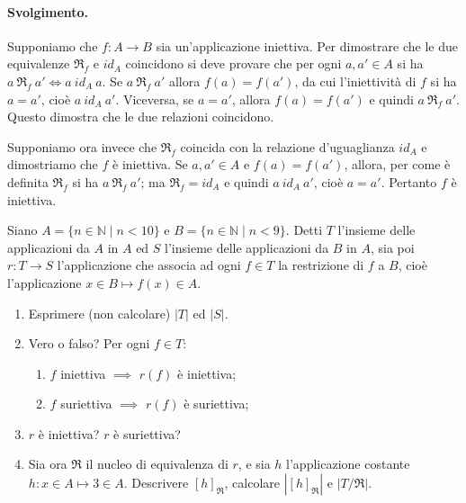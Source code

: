 \paragraph{Svolgimento.} Supponiamo che $f:A \rightarrow B$ sia un'applicazione iniettiva. Per dimostrare che le due equivalenze $\mathfrak{R}_{f}$ e $id_{A}$ coincidono si deve provare che per ogni $a,a' \in A$ si ha $a \ \mathfrak{R}_{f} \ a' \iff a \ id_{A} \ a$. Se $a \ \mathfrak{R}_{f} \ a'$ allora $f(a) = f(a')$, da cui l'iniettività di $f$ si ha $a=a'$, cioè $a \ id_{A} \ a'$. Viceversa, se $a=a'$, allora $f(a)=f(a')$ e quindi $a \ \mathfrak{R}_{f} \ a'$. Questo dimostra che le due relazioni coincidono.

Supponiamo ora invece che $\mathfrak{R}_{f}$ coincida con la relazione d'uguaglianza $id_{A}$ e dimostriamo che $f$ è iniettiva. Se $a,a' \in A$ e $f(a)=f(a')$, allora, per come è definita $\mathfrak{R}_{f}$ si ha $a \ \mathfrak{R}_{f} \ a'$; ma $\mathfrak{R}_{f} = id_{A}$ e quindi $a \ id_{A} \ a'$, cioè $a=a'$. Pertanto $f$ è iniettiva. \hfill \blacksquare
\begin{exsbox}
	Siano $A = \{n \in \mathbb{N} \; | \; n < 10 \}$ e $B = \{n \in \mathbb{N} \; | \; n < 9\}$. Detti $T$ l'insieme delle applicazioni da $A$ in $A$ ed $S$ l'insieme delle applicazioni da $B$ in $A$, sia poi $r: T \longrightarrow S$  l'applicazione che associa ad ogni $f \in T$ la restrizione di $f$ a $B$, cioè l'applicazione $x \in B \mapsto f(x) \in A$.
	\begin{enumerate}
		\item Esprimere (non calcolare) $|T|$ ed $|S|$.
		\item Vero o falso? Per ogni $f \in T$:
		\begin{enumerate}
			\item $f$ iniettiva $\implies$ $r(f)$ è iniettiva;
			\item $f$ suriettiva $\implies$ $r(f)$ è suriettiva;
		\end{enumerate}
		\item $r$ è iniettiva? $r$ è suriettiva?
		\item Sia ora $\mathfrak{R}$ il nucleo di equivalenza di $r$, e sia $h$ l'applicazione costante $h: x \in A \mapsto 3 \in A$. Descrivere $[h]_{\mathfrak{R}}$, calcolare $|[h]_{\mathfrak{R}}|$ e $|T/{\mathfrak{R}}|$.
	\end{enumerate}
\end{exsbox}
